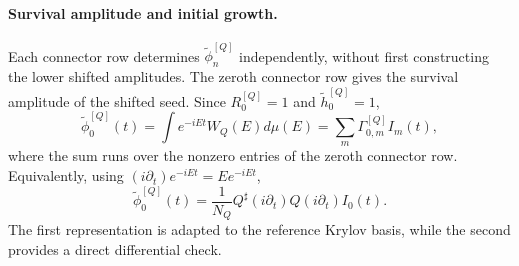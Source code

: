 \documentclass[a4paper,11pt]{article}
\def\dd{d}%
\def\ii{i}%
\def\ee{e}%
\theoremstyle{definition}
\theoremstyle{remark}
\newcommand{\dd}{\mathrm d}
\newcommand{\ii}{\mathrm i}
\newcommand{\ee}{\mathrm e}
\newcommand{\tphi}{\widetilde\phi}
\newcommand{\thh}{\widetilde h}
\newcommand{\Qsh}{Q^{\sharp}}
\begin{document}
\paragraph{Survival amplitude and initial growth.}
Each connector row determines
$\tphi_n^{[Q]}$ independently, without first constructing the lower shifted amplitudes. The zeroth connector row gives the survival amplitude of the shifted seed. Since
$R_0^{[Q]}=1$ and $\thh_0^{[Q]}=1$,
\begin{equation}
   \tphi_0^{[Q]}(t)
   =
   \int\ee^{-\ii Et}W_Q(E)\dd\mu(E)
   =
   \sum_m\Gamma_{0,m}^{[Q]}I_m(t),
   \label{eq:survival-connector-transfer-main}
\end{equation}
where the sum runs over the nonzero entries of the zeroth connector row. Equivalently, using
$(\ii\partial_t)\ee^{-\ii Et}=E\ee^{-\ii Et}$,
\begin{equation}
   \tphi_0^{[Q]}(t)
   =
   \frac{1}{N_Q}
   \Qsh(\ii\partial_t)Q(\ii\partial_t)I_0(t).
   \label{eq:survival-differential-transfer-main}
\end{equation}
The first representation is adapted to the reference Krylov basis, while the second provides a direct differential check.
\end{document}
